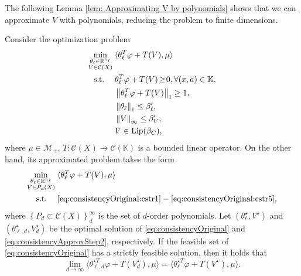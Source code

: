 The following Lemma \ref{lem: Approximating V by polynomials} shows that we can approximate $V$ with polynomials, reducing the problem to finite dimensions.

\begin{lemma}\label{lem: Approximating V by polynomials}
    Consider the optimization problem
    \begin{subequations}\label{eq:consistencyOriginal}
    \begin{align}
    \min_{\substack{\theta_\ell\in\mathbb{R}^{n_\ell}\\ V\in \mathcal C(X)}} 
    &\;\langle\theta_\ell^T\varphi + T(V),\mu \rangle\\
    \operatorname*{s.\hspace{-2pt}t.} \quad &\;\theta_\ell^T\varphi + T(V)\!\ge\! 0,\forall (x,a)\in\mathbb{K},\label{eq:consistencyOriginal:cstr1}\\
    &\;\left\|\theta_\ell^T\varphi + T(V)\right\|_1 \geq 1,\label{eq:consistencyOriginal:cstr2}\\
    &\;\left\|\theta_\ell\right\|_1\leq \beta_\ell',\\
    &\;\left\|V\right\|_\infty\leq \beta_V',\label{eq:consistencyOriginal:cstr4}\\
    &\;V\in \operatorname*{Lip}(\beta_C)\label{eq:consistencyOriginal:cstr5},
    \end{align}
    \end{subequations}
    where $\mu\in \mathcal{M}_+$, $T:\mathcal C(X)\rightarrow \mathcal C(\mathbb{K})$ is a bounded linear operator.
On the other hand, its approximated problem takes the form
\begin{subequations}\label{eq:consistencyApproxStep2}
\begin{align}
    \min_{\substack{\theta_\ell\in\mathbb{R}^{n_\ell}\\ V\in P_d(X)}} 
    &\;\langle\theta_\ell^T\varphi + T(V),\mu \rangle\\
    \operatorname*{s.\hspace{-2pt}t.} \quad &\;\eqref{eq:consistencyOriginal:cstr1}-\eqref{eq:consistencyOriginal:cstr5},\label{eq:consistencyApprox_cstr}
\end{align}
\end{subequations}
where $\left\{P_d\subset \mathcal C(X)\right\}_d^\infty$ is the set of $d$-order polynomials.
Let $(\theta_\ell^\star, V^\star)$ and $(\theta_{\ell, d}^\star , V_d^\star)$ be the optimal solution of \eqref{eq:consistencyOriginal} and \eqref{eq:consistencyApproxStep2}, respectively. If the feasible set of \eqref{eq:consistencyOriginal} has a strictly feasible solution, then it holds that
\begin{equation*}
    \lim_{d\rightarrow\infty}\langle\theta_{\ell, d}^{\star T}\varphi \!+\! T(V_d^\star),\mu \rangle = \langle\theta_\ell^{\star T}{\varphi} \!+\! T(V^\star),\mu \rangle.
\end{equation*}
\end{lemma}
